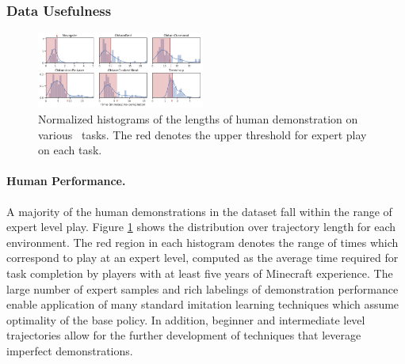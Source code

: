 \subsubsection{Data Usefulness}\label{sec:data_use}

\begin{figure}

    \vspace{-25pt}
    \begin{center}
        \includegraphics[width=0.49\textwidth]{./assets/task_performance.png}
    \caption{\small Normalized histograms of the lengths of human demonstration on various \minenet~tasks. The red {\color{red} \tiny{}} denotes the upper threshold  for expert play on each task.}
    \label{fig:human_quality}
    \end{center}
    \vspace{-20pt}
\end{figure}


\paragraph{Human Performance.}

    A majority of the human demonstrations in the dataset fall within the range of expert level play.
    Figure \ref{fig:human_quality} shows the distribution over trajectory length for each environment.
    The red region in each histogram denotes the range of times which correspond to play at an expert level, computed as the average time required for task completion by players with at least five years of Minecraft experience. 
    The large number of expert samples and rich labelings of demonstration 
    performance enable application of many standard imitation learning techniques which assume optimality of the base policy. 
    In addition, beginner and intermediate level trajectories 
    allow for the further development of techniques that leverage imperfect demonstrations.
    

